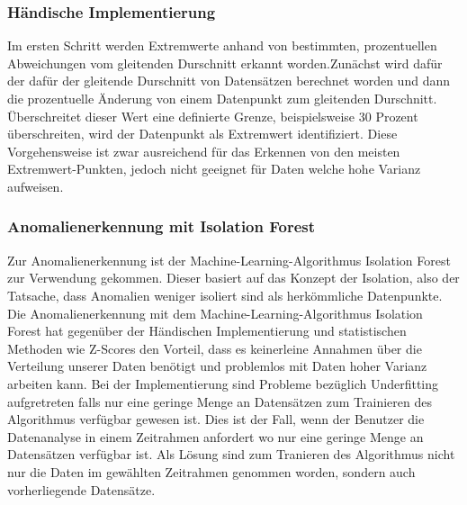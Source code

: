 \documentclass{report}
\begin{document}
\subsubsection{Händische Implementierung}
Im ersten Schritt werden Extremwerte anhand von bestimmten, prozentuellen Abweichungen vom gleitenden Durschnitt erkannt worden.Zunächst wird dafür der dafür der gleitende Durschnitt von Datensätzen berechnet worden und dann die prozentuelle Änderung von einem Datenpunkt zum gleitenden Durschnitt. Überschreitet dieser Wert eine definierte Grenze, beispielsweise 30 Prozent überschreiten, wird der Datenpunkt als Extremwert identifiziert.
Diese Vorgehensweise ist zwar ausreichend für das Erkennen von den meisten Extremwert-Punkten, jedoch nicht geeignet für Daten welche hohe Varianz aufweisen. 
\subsubsection{Anomalienerkennung mit Isolation Forest}
Zur Anomalienerkennung ist der Machine-Learning-Algorithmus Isolation Forest zur Verwendung gekommen. Dieser basiert auf das Konzept der Isolation, also der Tatsache, dass Anomalien weniger isoliert sind als herkömmliche Datenpunkte. 
Die Anomalienerkennung mit dem Machine-Learning-Algorithmus Isolation Forest hat gegenüber der Händischen Implementierung und statistischen Methoden wie Z-Scores den Vorteil, dass es keinerleine Annahmen über die Verteilung unserer Daten benötigt und problemlos mit Daten hoher Varianz arbeiten kann.
Bei der Implementierung sind Probleme bezüglich Underfitting aufgretreten falls nur eine geringe Menge an Datensätzen zum Trainieren des Algorithmus verfügbar gewesen ist. Dies ist der Fall, wenn der Benutzer die Datenanalyse in einem Zeitrahmen anfordert wo nur eine geringe Menge an Datensätzen verfügbar ist. Als Lösung sind zum Tranieren des Algorithmus nicht nur die Daten im gewählten Zeitrahmen genommen worden, sondern auch vorherliegende Datensätze. 
\end{document}
